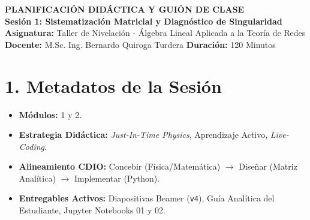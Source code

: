 \documentclass[11pt,a4paper]{article}
\begin{document}
\begin{center}
    {\Large \textbf{\textcolor{UCBblue}{PLANIFICACIÓN DIDÁCTICA Y GUIÓN DE CLASE}}}\\
    \vspace{0.3cm}
    {\large \textbf{Sesión 1: Sistematización Matricial y Diagnóstico de Singularidad}}\\
    \vspace{0.5cm}
    \textbf{Asignatura:} Taller de Nivelación - Álgebra Lineal Aplicada a la Teoría de Redes \\
    \textbf{Docente:} M.Sc. Ing. Bernardo Quiroga Turdera \quad \textbf{Duración:} 120 Minutos
\end{center}

\vspace{0.5cm}

\section*{1. Metadatos de la Sesión}
\begin{itemize}
    \item \textbf{Módulos:} 1 y 2.
    \item \textbf{Estrategia Didáctica:} \textit{Just-In-Time Physics}, Aprendizaje Activo, \textit{Live-Coding}.
    \item \textbf{Alineamiento CDIO:} Concebir (Física/Matemática) $\rightarrow$ Diseñar (Matriz Analítica) $\rightarrow$ Implementar (Python).
    \item \textbf{Entregables Activos:} Diapositivas Beamer (\texttt{v4}), Guía Analítica del Estudiante, Jupyter Notebooks 01 y 02.
\end{itemize}
\end{document}
